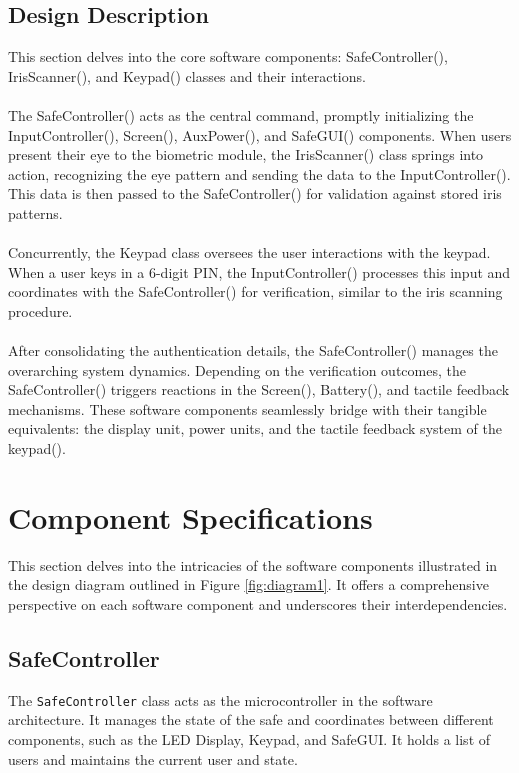 \documentclass{article}
\begin{document}
\subsection{Design Description}
This section delves into the core software components: SafeController(), IrisScanner(), and Keypad() classes and their interactions. \\ \\
The SafeController() acts as the central command, promptly initializing the InputController(), Screen(), AuxPower(), and SafeGUI() components. When users present their eye to the biometric module, the IrisScanner() class springs into action, recognizing the eye pattern and sending the data to the InputController(). This data is then passed to the SafeController() for validation against stored iris patterns. \\ \\
Concurrently, the Keypad class oversees the user interactions with the keypad. When a user keys in a 6-digit PIN, the InputController() processes this input and coordinates with the SafeController() for verification, similar to the iris scanning procedure. \\ \\
After consolidating the authentication details, the SafeController() manages the overarching system dynamics. Depending on the verification outcomes, the SafeController() triggers reactions in the Screen(), Battery(), and tactile feedback mechanisms. These software components seamlessly bridge with their tangible equivalents: the display unit, power units, and the tactile feedback system of the keypad().

\section{Component Specifications}
This section delves into the intricacies of the software components illustrated in the design diagram outlined in Figure \ref{fig:diagram1}. It offers a comprehensive perspective on each software component and underscores their interdependencies.

\subsection{SafeController}
The \texttt{SafeController} class acts as the microcontroller in the software architecture. It manages the state of the safe and coordinates between different components, such as the LED Display, Keypad, and SafeGUI. It holds a list of users and maintains the current user and state.
\end{document}
